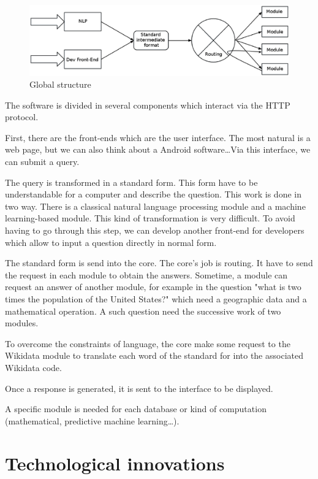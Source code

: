 \documentclass[a4paper,10pt]{article}
\begin{document}
\begin{figure}[!h]
    \centering
    \includegraphics[scale=0.39]{images/Structure-PPP-en.eps}
    \caption{Global structure}
\end{figure}

The software is divided in several components which interact via the HTTP protocol.

First, there are the front-ends which are the user interface. The most natural is a web page, but we can also think about a Android software\ldots Via this interface, we can submit a query.

The query is transformed in a standard form. This form have to be understandable for a computer and describe the question. This work is done in two way. There is a classical natural language processing module and a machine learning-based module. This kind of transformation is very difficult. To avoid having to go through this step, we can develop another front-end for developers which allow to input a question directly in normal form.

The standard form is send into the core. The core's job is routing. It have to send the request in each module to obtain the answers. Sometime, a module can request an answer of another module, for example in the question "what is two times the population of the United States?" which need a geographic data and a mathematical operation. A such question need the successive work of two modules.

To overcome the constraints of language, the core make some request to the Wikidata module to translate each word of the standard for into the associated Wikidata code.

Once a response is generated, it is sent to the interface to be displayed.

A specific module is needed for each database or kind of computation (mathematical, predictive machine learning\ldots).

\section{Technological innovations}
\end{document}
